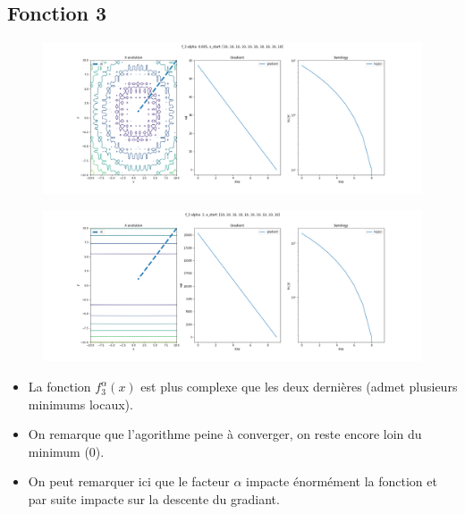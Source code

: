 \documentclass[twoside,10pt,a4paper]{article}
\numberwithin{equation}{section}					%
\numberwithin{figure}{section}						%
\begin{document}
\subsection{Fonction 3 }\label{sec:subsection2}
\begin{figure}[H]
    \centering
    \includegraphics[width=\textwidth]{imgs/newton/f_3_a-0.005_newton.png}
    \caption{}
\end{figure}
\begin{figure}[H]
    \centering
    \includegraphics[width=\textwidth]{imgs/newton/f_3_a-3_newton.png}
    \caption{}
\end{figure}
\begin{itemize}
	\item La fonction $f_3^{\alpha}(x)$ est plus complexe que les deux dernières (admet plusieurs minimums locaux).
	\item On remarque que l'agorithme peine à converger, on reste encore loin du minimum (0).
	\item On peut remarquer ici que le facteur $\alpha$ impacte énormément la fonction et par suite impacte sur la descente du gradiant.
\end{itemize}
\end{document}
